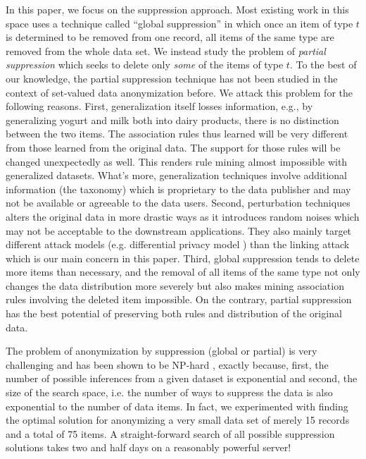 In this paper, we focus on the suppression approach. Most existing work
in this space uses a technique called ``global suppression''
\cite{Cao:2010:rho} in which once an item of type $t$ is determined to
be removed from one record, all items of the same type
are removed from the whole data set. We instead study the problem of
{\em partial suppression} which seeks to delete only {\em some} of
the items of type $t$. To the best of our knowledge,
the partial suppression technique has not been studied in the context of
set-valued data anonymization before. We attack this problem for
the following reasons. First, generalization itself losses information,
e.g., by generalizing yogurt and milk both into dairy products,
there is no distinction between the two items. The association rules thus
learned will be very different from those learned from the original data.
The support for those rules will be changed unexpectedly as well.
This renders rule mining almost impossible with generalized datasets.
What's more, generalization techniques involve additional
information (the taxonomy) which is proprietary to the data publisher
and may not be available or agreeable to the data users.
Second, perturbation
techniques alters the original data in more drastic ways as it introduces
random noises which may not be acceptable to the downstream applications.
They also mainly target different attack models
(e.g. differential privacy model \cite{ChenMFDX11:Diff})
than the linking attack which is our main concern in this paper.
Third, global suppression tends to delete more items than necessary,
and the removal of all items of the same type not only changes the
data distribution more severely but also makes mining association rules
involving the deleted item impossible. On the contrary, partial
suppression has the best potential of preserving both rules and
distribution of the original data.

The problem of anonymization by suppression (global or partial)
is very challenging and has been shown to be NP-hard
\cite{atallah99:disclosure, Xu:2008:ATD}, exactly because, first,
the number of possible inferences from a given dataset is exponential
and second, the size of the search space, i.e. the number of ways
to suppress the data is also exponential to the number of data items.
In fact, we experimented with finding the optimal solution for anonymizing
a very small data set of merely 15 records and a total of 75 items.
A straight-forward search of all possible suppression solutions
takes two and half days on a reasonably powerful server!

